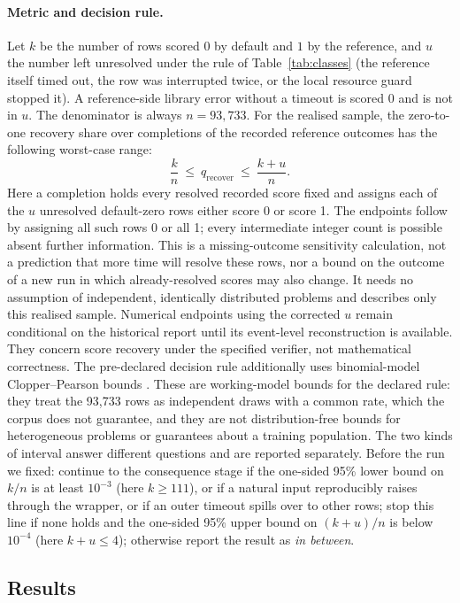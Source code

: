 \documentclass[10pt,a4paper]{article}
\let\cite\citep
\begin{document}
\paragraph{Metric and decision rule.}
Let $k$ be the number of rows scored $0$ by default and $1$ by the reference,
and $u$ the number left unresolved under the rule of Table~\ref{tab:classes}
(the reference itself timed out, the row was interrupted twice, or the local
resource guard stopped it). A reference-side library error without a timeout
is scored $0$ and is not in $u$. The denominator is always $n=93{,}733$. For the realised sample, the zero-to-one recovery share over completions of the recorded
reference outcomes has the following worst-case range:
\[
  \frac{k}{n}\ \leq\ q_{\mathrm{recover}}\ \leq\ \frac{k+u}{n}.
\]
Here a completion holds every resolved recorded score fixed and assigns
each of the $u$ unresolved default-zero rows either score 0 or score 1.
The endpoints follow by assigning all such rows 0 or all 1; every
intermediate integer count is possible absent further information.
This is a missing-outcome sensitivity calculation, not a prediction that
more time will resolve these rows, nor a bound on the outcome of a new run
in which already-resolved scores may also change. It needs no assumption
of independent, identically distributed problems and describes only this
realised sample. Numerical endpoints using the corrected $u$ remain
conditional on the historical report until its event-level reconstruction
is available.
They concern score recovery under the specified verifier, not mathematical
correctness. The pre-declared decision rule additionally uses binomial-model
Clopper--Pearson bounds \cite{clopper1934}. These are working-model bounds
for the declared rule: they treat the 93,733 rows as independent draws with a
common rate, which the corpus does not guarantee, and they are not
distribution-free bounds for heterogeneous problems or guarantees about a
training population. The two kinds of interval answer different questions and
are reported separately.
Before the run we fixed: continue to the consequence stage if the one-sided
95\% lower bound on $k/n$ is at least $10^{-3}$ (here $k\ge111$), or if a
natural input reproducibly raises through the wrapper, or if an outer timeout
spills over to other rows; stop this line if none holds and the one-sided
95\% upper bound on $(k+u)/n$ is below $10^{-4}$ (here $k+u\le4$); otherwise
report the result as \emph{in between}.

\subsection{Results}
\end{document}
